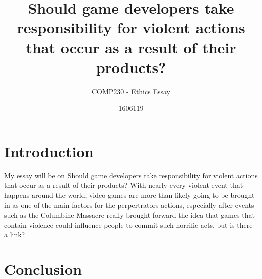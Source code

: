 \documentclass{scrartcl}
\title{Should game developers take responsibility for violent actions that occur as a result of their products?}
\subtitle{COMP230 - Ethics Essay}
\author{1606119}
\begin{document}
\maketitle

\abstract{} 

\section{Introduction}
My essay will be on Should game developers take responsibility for violent actions that occur as a result of their products? With nearly every violent event that happens around the world, video games are more than likely going to be brought in as one of the main factors for the perpertrators actions, especially after events such as the Columbine Massacre really brought forward the idea that games that contain violence could influence people to commit such horrific acts, but is there a link? 



\section{}



\section{}



\section{Conclusion}










\end{document}
